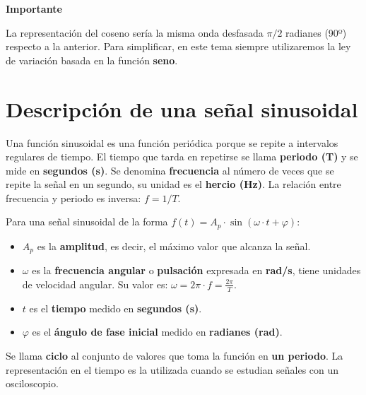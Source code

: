 \documentclass[
  a4paper,
  DIV=11,
  numbers=noendperiod]{scrreprt}
\providecommand{\tightlist}{%
  \setlength{\itemsep}{0pt}\setlength{\parskip}{0pt}}
\begin{document}
\begin{tcolorbox}[enhanced jigsaw, breakable, colback=white, left=2mm, leftrule=.75mm, rightrule=.15mm, toprule=.15mm, colframe=quarto-callout-tip-color-frame, arc=.35mm, bottomrule=.15mm, opacityback=0]

\vspace{-3mm}\textbf{Importante}\vspace{3mm}

La representación del coseno sería la misma onda desfasada \(\pi/2\)
radianes (90º) respecto a la anterior. Para simplificar, en este tema
siempre utilizaremos la ley de variación basada en la función
\textbf{seno}.

\end{tcolorbox}

\section{Descripción de una señal
sinusoidal}\label{descripciuxf3n-de-una-seuxf1al-sinusoidal}

Una función sinusoidal es una función periódica porque se repite a
intervalos regulares de tiempo. El tiempo que tarda en repetirse se
llama \textbf{periodo (T)} y se mide en \textbf{segundos (s)}. Se
denomina \textbf{frecuencia} al número de veces que se repite la señal
en un segundo, su unidad es el \textbf{hercio (Hz)}. La relación entre
frecuencia y periodo es inversa: \(f = 1/T\).

Para una señal sinusoidal de la forma
\(f(t) = A_p \cdot \sin(\omega \cdot t + \varphi)\):

\begin{itemize}
\tightlist
\item
  \textbf{\(A_p\)} es la \textbf{amplitud}, es decir, el máximo valor
  que alcanza la señal.
\item
  \textbf{\(\omega\)} es la \textbf{frecuencia angular} o
  \textbf{pulsación} expresada en \textbf{rad/s}, tiene unidades de
  velocidad angular. Su valor es:
  \(\omega = 2\pi \cdot f = \frac{2\pi}{T}\).
\item
  \textbf{\(t\)} es el \textbf{tiempo} medido en \textbf{segundos (s)}.
\item
  \textbf{\(\varphi\)} es el \textbf{ángulo de fase inicial} medido en
  \textbf{radianes (rad)}.
\end{itemize}

Se llama \textbf{ciclo} al conjunto de valores que toma la función en
\textbf{un periodo}. La representación en el tiempo es la utilizada
cuando se estudian señales con un osciloscopio.
\end{document}
